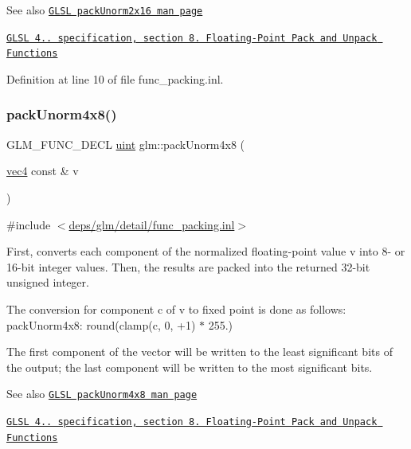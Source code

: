 \begin{DoxySeeAlso}{See also}
\href{http://www.opengl.org/sdk/docs/manglsl/xhtml/packUnorm2x16.xml}{\tt G\+L\+SL pack\+Unorm2x16 man page} 

\href{http://www.opengl.org/registry/doc/GLSLangSpec.4.20.8.pdf}{\tt G\+L\+SL 4.. specification, section 8. Floating-\/\+Point Pack and Unpack Functions} 
\end{DoxySeeAlso}


Definition at line 10 of file func\+\_\+packing.\+inl.

\mbox{\label{group__core__func__packing_gaf7d2f7341a9eeb4a436929d6f9ad08f2}} 
\subsubsection{\texorpdfstring{pack\+Unorm4x8()}{packUnorm4x8()}}
{\footnotesize\ttfamily G\+L\+M\+\_\+\+F\+U\+N\+C\+\_\+\+D\+E\+CL \hyperlink{group__core__precision_ga4fd29415871152bfb5abd588334147c8}{uint} glm\+::pack\+Unorm4x8 (\begin{DoxyParamCaption}\item[{\hyperlink{group__core__types_ga5881b1b022d7fd1b7218f5916532dd02}{vec4} const \&}]{v }\end{DoxyParamCaption})}



{\ttfamily \#include $<$\hyperlink{func__packing_8inl}{deps/glm/detail/func\+\_\+packing.\+inl}$>$}

First, converts each component of the normalized floating-\/point value v into 8-\/ or 16-\/bit integer values. Then, the results are packed into the returned 32-\/bit unsigned integer.

The conversion for component c of v to fixed point is done as follows\+: pack\+Unorm4x8\+: round(clamp(c, 0, +1) $\ast$ 255.)

The first component of the vector will be written to the least significant bits of the output; the last component will be written to the most significant bits.

\begin{DoxySeeAlso}{See also}
\href{http://www.opengl.org/sdk/docs/manglsl/xhtml/packUnorm4x8.xml}{\tt G\+L\+SL pack\+Unorm4x8 man page} 

\href{http://www.opengl.org/registry/doc/GLSLangSpec.4.20.8.pdf}{\tt G\+L\+SL 4.. specification, section 8. Floating-\/\+Point Pack and Unpack Functions} 
\end{DoxySeeAlso}


